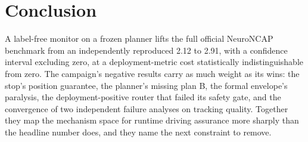 \documentclass[11pt]{article}
\begin{document}
\section{Conclusion}
A label-free monitor on a frozen planner lifts the full official NeuroNCAP benchmark from an
independently reproduced 2.12 to 2.91, with a confidence interval excluding zero, at a
deployment-metric cost statistically indistinguishable from zero. The campaign's negative
results carry as much weight as its wins: the stop's position guarantee, the planner's missing
plan B, the formal envelope's paralysis, the deployment-positive router that failed its safety
gate, and the convergence of two independent failure analyses on tracking quality. Together
they map the mechanism space for runtime driving assurance more sharply than the headline
number does, and they name the next constraint to remove.
\end{document}
